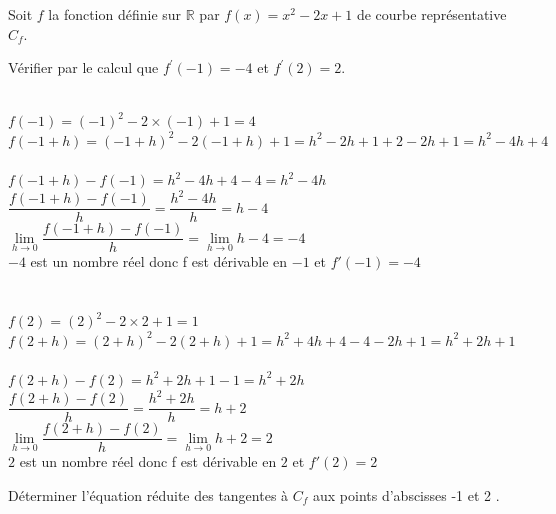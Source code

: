 \documentclass[12pt,a4paper]{article}  %
\begin{document}
Soit $f$ la fonction définie sur $\mathbb{R}$ par $f(x)=x^2-2 x+1$ de courbe représentative $C_f$.
\begin{enumMet}
	\item Vérifier par le calcul que $f^{\prime}(-1)=-4$ et $f^{\prime}(2)=2$.
	\begin{corrBox}
		\underline{}
		\ \\
		
		$f(-1)=(-1)^2-2\times (-1)+1=4$
		\ \\
		
		$f(-1+h)=(-1+h)^2-2(-1+h)+1=h^2-2h+1+2-2h+1=h^2-4h+4$
		\ \\
		
		$f(-1+h)-f(-1)=h^2-4h+4-4 = h^2-4h$
		\ \\
		
		$\dfrac{f(-1+h)-f(-1)}{h}=\dfrac{h^2-4h}{h}=h-4$
		\ \\
		
		$\lim \limits_{h \rightarrow 0} \dfrac{f(-1+h)-f(-1)}{h}=\lim \limits_{h \rightarrow 0} h-4=-4$
		\ \\
		
		$-4$ est un nombre réel donc f est dérivable en $-1$ et $f'(-1)=-4$
		\ \\
		\ \\
		\newpage
		\underline{}
		\ \\
		
		$f(2)=(2)^2-2\times 2+1=1$
		\ \\
		
		$f(2+h)=(2+h)^2-2(2+h)+1=h^2+4h+4-4-2h+1=h^2+2h+1$
		\ \\
		
		$f(2+h)-f(2)=h^2+2h+1-1 = h^2+2h$
		\ \\
		
		$\dfrac{f(2+h)-f(2)}{h}=\dfrac{h^2+2h}{h}=h+2$
		\ \\
		
		$\lim \limits_{h \rightarrow 0} \dfrac{f(2+h)-f(2)}{h}=\lim \limits_{h \rightarrow 0} h+2=2$
		\ \\
		
		$2$ est un nombre réel donc f est dérivable en $2$ et $f'(2)=2$		
	\end{corrBox}
	\item Déterminer l'équation réduite des tangentes à $C_f$ aux points d'abscisses -1 et 2 .
	\begin{corrBox}
		\grasInProp{Tangente en $-1$}
		
		\ \\
		

\end{corrBox}
\end{enumMet}
\end{document}
